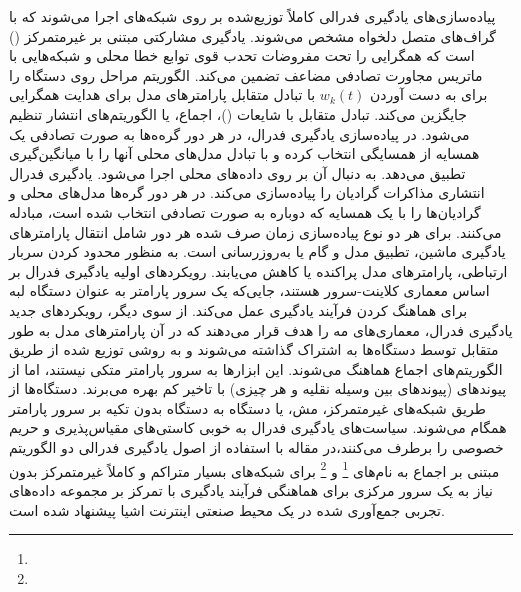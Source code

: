 پیاده‌سازی‌های یادگیری فدرالی کاملاً توزیع‌شده بر روی شبکه‌های  اجرا می‌شوند که با گراف‌های متصل دلخواه مشخص می‌شوند. یادگیری مشارکتی مبتنی بر  غیرمتمرکز () است که همگرایی را تحت مفروضات تحدب قوی توابع خطا محلی و شبکه‌هایی با ماتریس مجاورت تصادفی مضاعف تضمین می‌کند. الگوریتم  مراحل  روی دستگاه را برای به دست آوردن $w_k(t)$ با تبادل متقابل پارامترهای مدل برای هدایت همگرایی جایگزین می‌کند. تبادل متقابل با شایعات ()، اجماع، یا الگوریتم‌های انتشار تنظیم می‌شود. 
در پیاده‌سازی  یادگیری فدرال، در هر دور گره‌ه‌ها به صورت تصادفی یک همسایه از همسایگی انتخاب کرده و با تبادل مدل‌های محلی آنها را با میانگین‌گیری تطبیق می‌دهد. به دنبال آن  بر روی داده‌های محلی اجرا می‌شود. یادگیری فدرال انتشاری مذاکرات گرادیان را پیاده‌سازی می‌کند. در هر دور گره‌ها مدل‌های محلی و گرادیان‌ها را با یک همسایه که دوباره به صورت تصادفی انتخاب شده است، مبادله می‌کنند. برای هر دو نوع پیاده‌سازی زمان صرف شده هر دور شامل انتقال پارامترهای یادگیری ماشین، تطبیق مدل و گام  یا به‌روزرسانی است. به منظور محدود کردن سربار ارتباطی، پارامترهای مدل پراکنده یا کاهش می‌یابند. 
رویکردهای اولیه یادگیری فدرال بر اساس معماری کلاینت-سرور هستند، جایی‌که یک سرور پارامتر به عنوان دستگاه لبه برای هماهنگ کردن فرآیند یادگیری عمل می‌کند. از سوی دیگر، رویکردهای جدید یادگیری فدرال، معماری‌های مه را هدف قرار می‌دهند که در آن پارامترهای مدل به طور متقابل توسط دستگاه‌ها به اشتراک گذاشته می‌شوند و به روشی توزیع شده از طریق الگوریتم‌های اجماع  هماهنگ می‌شوند. این ابزارها به سرور پارامتر متکی نیستند، اما از پیوندهای  (پیوندهای بین وسیله نقلیه و هر چیزی) با تاخیر کم بهره می‌برند. دستگاه‌ها از طریق شبکه‌های غیرمتمرکز، مش، یا دستگاه به دستگاه بدون تکیه بر سرور پارامتر همگام می‌شوند. سیاست‌های یادگیری فدرال به خوبی کاستی‌های مقیاس‌پذیری و حریم خصوصی را برطرف می‌کنند،در مقاله \cite{Fed11} با استفاده از اصول یادگیری فدرالی دو الگوریتم مبتنی بر اجماع به نام‌های \footnote{} و \footnote{} برای شبکه‌های بسیار متراکم و کاملاً غیرمتمرکز بدون نیاز به یک سرور مرکزی برای هماهنگی فرآیند یادگیری با تمرکز بر مجموعه داده‌های تجربی جمع‌آوری شده در یک محیط صنعتی اینترنت اشیا پیشنهاد شده است. 

